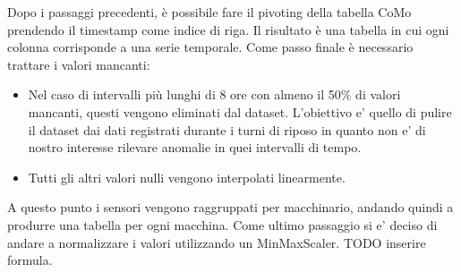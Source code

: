 Dopo i passaggi precedenti, è possibile fare il pivoting della tabella CoMo  prendendo il timestamp come indice di riga. Il risultato è una tabella in cui ogni colonna corrisponde a una serie temporale. 
Come passo finale è necessario trattare i valori mancanti:
\begin{itemize}
\item Nel caso di intervalli più lunghi di 8 ore con almeno il 50\% di valori mancanti, questi vengono eliminati dal dataset. L'obiettivo e' quello di pulire il dataset dai dati registrati durante i turni di riposo in quanto non e' di nostro interesse rilevare anomalie in quei intervalli di tempo.
\item Tutti gli altri valori nulli vengono interpolati linearmente.
\end{itemize}
A questo punto i sensori vengono raggruppati per macchinario, andando quindi a produrre una tabella per ogni macchina.
Come ultimo passaggio si e' deciso di andare a normalizzare i valori utilizzando un MinMaxScaler.
TODO inserire formula.


